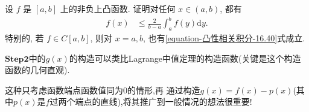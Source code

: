 \documentclass[../../main.tex]{subfiles}
\begin{document}
\begin{example}
设 $f$ 是 $[a,b]$ 上的非负上凸函数. 证明对任何 $x \in (a,b)$, 都有
\begin{align}\label{equation-凸性相关积分-16.40}
f(x) &\leqslant \frac{2}{b - a}\int_{a}^{b}f(y)\mathrm{d}y.
\end{align}
特别的, 若 $f \in C[a,b]$, 则对 $x = a,b$, 也有\eqref{equation-凸性相关积分-16.40}式成立.
\end{example}
\begin{remark}
$\mathbf{Step}\mathbf{2}$中的$g(x)$的构造可以类比Lagrange中值定理的构造函数(关键是这个构造函数的几何直观).
\end{remark}
\begin{note}
这种只考虑函数端点函数值同为0的情形,再
通过构造$g(x)=f(x)-p(x)$(其中$p(x)$是$f$过两个端点的直线),将其推广到一般情况的想法很重要!
\end{note}
\end{document}
